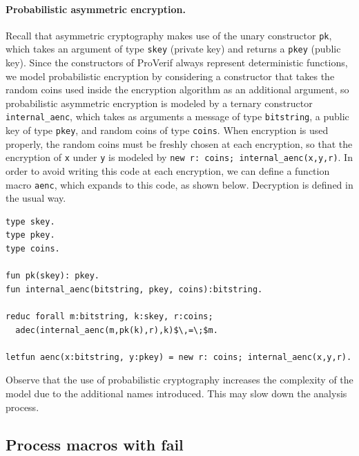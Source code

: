 \documentclass{book}
\begin{document}
\paragraph{Probabilistic asymmetric encryption.}
Recall that asymmetric cryptography makes use of the unary constructor {\tt pk}, which takes an argument of type {\tt skey} (private key) and returns a {\tt pkey} (public key). Since the constructors of ProVerif always represent deterministic functions, we model probabilistic encryption by considering a constructor that takes the random coins used inside the encryption algorithm as an additional argument, so probabilistic asymmetric encryption is modeled by a ternary constructor \lstinline!internal_aenc!, which takes as arguments a message of type {\tt bitstring}, a public key of type {\tt pkey}, and random coins of type {\tt coins}. When encryption is used properly, the random coins must be freshly chosen at each encryption, so that the encryption of \lstinline!x! under \lstinline!y! is modeled by \lstinline!new r: coins; internal_aenc(x,y,r)!. In order to avoid writing this code at each encryption, we can define a function macro \lstinline!aenc!, which expands to this code, as shown below. Decryption is defined in the usual way.
%
\begin{lstlisting}[numbers=none]
type skey.
type pkey.
type coins.

fun pk(skey): pkey.
fun internal_aenc(bitstring, pkey, coins):bitstring.

reduc forall m:bitstring, k:skey, r:coins;
  adec(internal_aenc(m,pk(k),r),k)$\,=\;$m.

letfun aenc(x:bitstring, y:pkey) = new r: coins; internal_aenc(x,y,r).
\end{lstlisting}
%
Observe that the use of probabilistic cryptography increases the complexity of the model due to the additional names introduced. This may slow down the analysis process.

\subsection{Process macros with fail}
\end{document}
